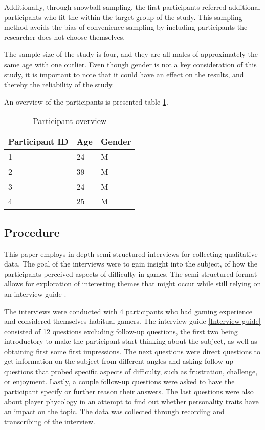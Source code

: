 Additionally, through snowball sampling, the first participants referred additional participants who fit the within the target group of the study. This sampling method avoids the bias of convenience sampling by including participants the researcher does not choose themselves. 

The sample size of the study is four, and they are all males of approximately the same age with one outlier. Even though gender is not a key consideration of this study, it is important to note that it could have an effect on the results, and thereby the reliability of the study. 

An overview of the participants is presented table \ref{Participant overview}.

\begin{table}[ht]
\centering
\begin{tabular}{|l|l|l|} \hline %
\textbf{Participant ID}& \textbf{Age} &\textbf{Gender}\\
\hline
1& 24 &M\\ \hline
2& 39 &M\\ \hline
 3&24 &M\\ \hline
 4&25 &M\\\hline
\end{tabular}
\caption{Participant overview}\label{Participant overview}
\end{table}


\subsection{Procedure}
This paper employs in-depth semi-structured interviews for collecting qualitative data. The goal of the interviews were to gain insight into the subject, of how the participants perceived aspects of difficulty in games. The semi-structured format allows for exploration of interesting themes that might occur while still relying on an interview guide \cite{thomas_bjorner_qualitative_2015}. 

The interviews were conducted with 4 participants who had gaming experience and considered themselves habitual gamers. The interview guide \ref{Interview guide} consisted of 12 questions excluding follow-up questions, the first two being introductory to make the participant start thinking about the subject, as well as obtaining first some first impressions. The next questions were direct questions to get information on the subject from different angles and asking follow-up questions that probed specific aspects of difficulty, such as frustration, challenge, or enjoyment. 
Lastly, a couple follow-up questions were asked to have the participant specify or further reason their answers. The last questions were also about player phycology in an attempt to find out whether personality traits have an impact on the topic. The data was collected through recording and transcribing of the interview.

